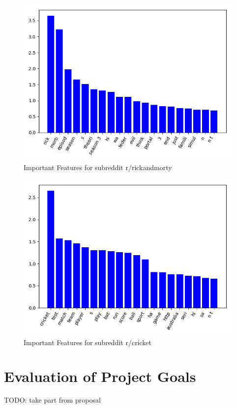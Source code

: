 \documentclass{sig-alternate-05-2015}
\begin{document}
\begin{figure}[H]
\centering
\includegraphics[width=\linewidth]{plots/coefficients-rickandmorty-dim-713.png}
\caption{Important Features for subreddit r/rickandmorty}
\end{figure}

\begin{figure}[H]
\centering
\includegraphics[width=\linewidth]{plots/coefficients-cricket-dim-200.png}
\caption{Important Features for subreddit r/cricket}
\end{figure}

\section{Evaluation of Project Goals}
TODO: take part from proposal
\end{document}
